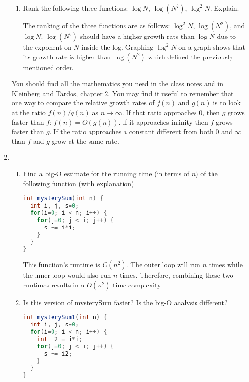 \documentclass[letterpaper, 11pt]{article}
\begin{document}
\begin{enumerate}[leftmargin=*]
\begin{enumerate}
        \item Rank the following three functions: $\log{N}$, $\log({N^2})$, $\log^2{N}$. Explain.

        The ranking of the three functions are as follows: $\log^2{N}$, $\log({N^2})$, and $\log{N}$. $\log({N^2})$ should have a higher growth rate than $\log{N}$ due to the exponent on $N$ inside the log. Graphing $\log^2{N}$ on a graph shows that its growth rate is higher than $\log({N^2})$ which defined the previously mentioned order.
    \end{enumerate}

    You should find all the mathematics you need in the class notes and in Kleinberg and Tardos, chapter 2. You may find it useful to remember that one way to compare the relative growth rates of $f(n)$ and $g(n)$ is to look at the ratio $f(n)/g(n)$ as $n \to \infty$. If that ratio approaches 0, then $g$ grows faster than $f$: $f(n) = O(g(n))$. If it approaches infinity then $f$ grows faster than $g$. If the ratio approaches a constant different from both 0 and $\infty$ than $f$ and $g$ grow at the same rate.

    \item \begin{enumerate}
        \item Find a big-O estimate for the running time (in terms of $n$) of the following function (with explanation)
\begin{tcolorbox}
\begin{lstlisting}[language=Java]
int mysterySum(int n) {
  int i, j, s=0;
  for(i=0; i < n; i++) {
    for(j=0; j < i; j++) {
      s += i*i;
    }
  }
}
\end{lstlisting}   
\end{tcolorbox}


This function's runtime is $O(n^2)$. The outer loop will run $n$ times while the inner loop would also run $n$ times. Therefore, combining these two runtimes results in a $O(n^2)$ time complexity.

        \item Is this version of mysterySum faster? Is the big-O analysis different?
\begin{tcolorbox}
\begin{lstlisting}[language=Java]
int mysterySum1(int n) {
  int i, j, s=0;
  for(i=0; i < n; i++) {
    int i2 = i*i;
    for(j=0; j < i; j++) {
      s += i2;
    }
  }
}
\end{lstlisting}
\end{tcolorbox}


\end{enumerate}
\end{enumerate}
\end{document}
